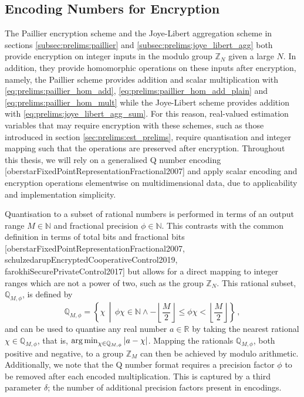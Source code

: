 \subsection{Encoding Numbers for Encryption}\label{subsec:prelims:encoding}
The Paillier encryption scheme and the Joye-Libert aggregation scheme in sections \ref{subsec:prelims:paillier} and \ref{subsec:prelims:joye_libert_agg} both provide encryption on integer inputs in the modulo group $\mathbb{Z}_N$ given a large $N$. In addition, they provide homomorphic operations on these inputs after encryption, namely, the Paillier scheme provides addition and scalar multiplication with \eqref{eq:prelims:paillier_hom_add}, \eqref{eq:prelims:paillier_hom_add_plain} and \eqref{eq:prelims:paillier_hom_mult} while the Joye-Libert scheme provides addition with \eqref{eq:prelims:joye_libert_agg_sum}. For this reason, real-valued estimation variables that may require encryption with these schemes, such as those introduced in section \ref{sec:prelims:est_prelims}, require quantisation and integer mapping such that the operations are preserved after encryption. Throughout this thesis, we will rely on a generalised Q number encoding [oberstarFixedPointRepresentationFractional2007] and apply scalar encoding and encryption operations elementwise on multidimensional data, due to applicability and implementation simplicity.

Quantisation to a subset of rational numbers is performed in terms of an output range $M \in \mathbb{N}$ and fractional precision $\phi \in \mathbb{N}$. This contrasts with the common definition in terms of total bits and fractional bits [oberstarFixedPointRepresentationFractional2007, schulzedarupEncryptedCooperativeControl2019, farokhiSecurePrivateControl2017] but allows for a direct mapping to integer ranges which are not a power of two, such as the group $\mathbb{Z}_N$. This rational subset, $\mathbb{Q}_{M,\phi}$, is defined by
\begin{equation}
    \mathbb{Q}_{M,\phi} = \left\{\chi \,\middle|\, \phi \chi \in \mathbb{N} \wedge -\left\lfloor\frac{M}{2}\right\rfloor \leq \phi \chi < \left\lfloor\frac{M}{2}\right\rfloor \right\}\,,
\end{equation}
and can be used to quantise any real number $a \in \mathbb{R}$ by taking the nearest rational $\chi \in \mathbb{Q}_{M,\phi}$, that is, $\operatorname*{arg\,min}_{\chi\in\mathbb{Q}_{M,\phi}} |a-\chi|$. Mapping the rationals $\mathbb{Q}_{M,\phi}$, both positive and negative, to a group $\mathbb{Z}_M$ can then be achieved by modulo arithmetic. Additionally, we note that the Q number format requires a precision factor $\phi$ to be removed after each encoded multiplication. This is captured by a third parameter $\delta$; the number of additional precision factors present in encodings.

